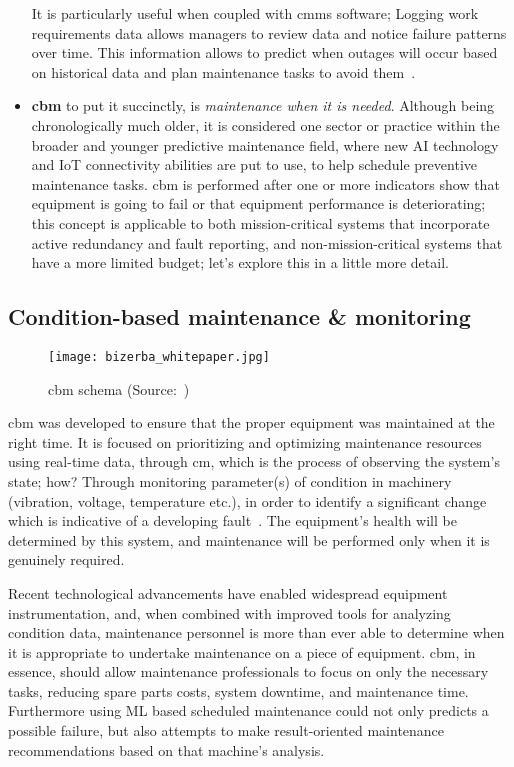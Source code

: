\begin{itemize}
          It is particularly useful when coupled with \acs{cmms} software; Logging work requirements data allows managers to review data and notice failure patterns over time.
          This information allows to predict when outages will occur based on historical data and plan maintenance tasks to avoid them~\cite{Misc:trout_2019_preventive}.
    \item \textbf{\ac{cbm}} to put it succinctly, is \textit{maintenance when it is needed}. Although being chronologically much older,
          it is considered one sector or practice within the broader and younger predictive maintenance field, where new \ac{AI} technology and \ac{IoT}
          connectivity abilities are put to use, to help schedule preventive maintenance tasks.
          \acs{cbm} is performed after one or more indicators show that equipment is going to fail or that equipment performance is deteriorating;
          this concept is applicable to both mission-critical systems that incorporate active redundancy and fault reporting, and non-mission-critical systems
          that have a more limited budget; let's explore this in a little more detail.
\end{itemize}

\subsection{Condition-based maintenance \& monitoring}
\begin{figure}[ht]
    \centering
    \texttt{[image: bizerba\_whitepaper.jpg]}
    \caption{\acl{cbm} schema (Source:~\cite{file:bizerbaspa_conditionbased})}
\end{figure}
\ac{cbm} was developed to ensure that the proper equipment was maintained at the right time. It is focused on prioritizing and optimizing
maintenance resources using real-time data, through \ac{cm}, which is the process of observing the system's state; how?
Through monitoring parameter(s) of condition in machinery (vibration, voltage, temperature etc.), in order to identify a significant change which is indicative of a developing fault~\cite{Inbook:hitchcock_2012_iso}.
The equipment's health will be determined by this system, and maintenance will be performed only when it is genuinely required.

Recent technological advancements have enabled widespread equipment instrumentation, and, when combined with improved tools for analyzing condition data,
maintenance personnel is more than ever able to determine when it is appropriate to undertake maintenance on a piece of equipment.
\ac{cbm}, in essence, should allow maintenance professionals to focus on only the necessary tasks, reducing spare parts costs, system downtime, and maintenance time.
Furthermore using \ac{ML} based scheduled maintenance could not only predicts a possible failure, but also attempts to make result-oriented maintenance recommendations based on that machine's analysis.

